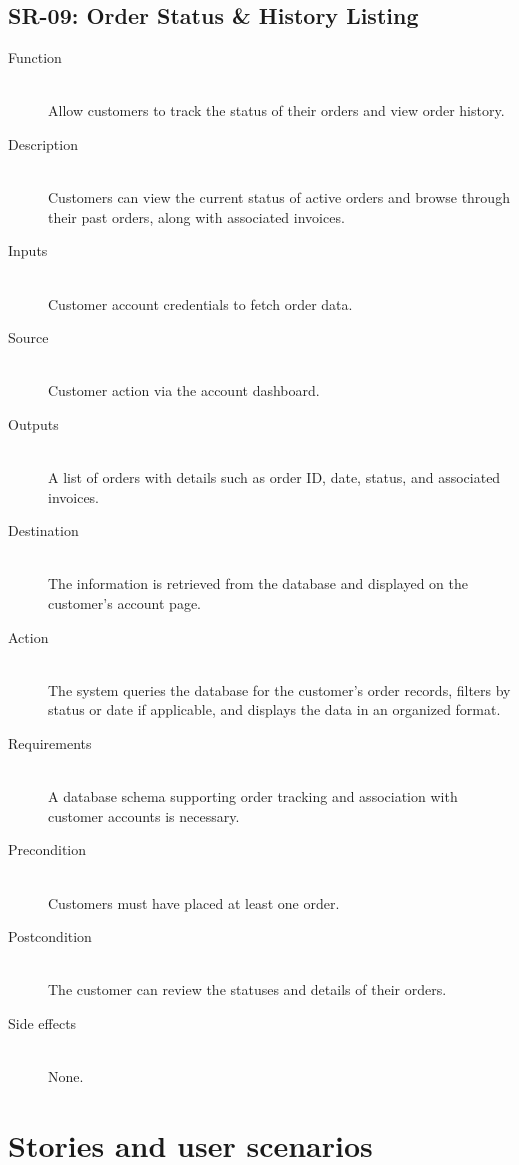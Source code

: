\documentclass[a4paper,journal]{IEEEtran}
\begin{document}
\subsection{SR-09: Order Status \& History Listing}
\begin{description}
  \item[Function] \hfill \\
  Allow customers to
  track the status of their orders and view order history.
  \item[Description] \hfill \\
  Customers can view the current status of active orders
  and browse through their past orders, along with associated invoices.
  \item[Inputs] \hfill \\
  Customer account credentials to fetch order data.
  \item[Source] \hfill \\
  Customer action via the account dashboard.
  \item[Outputs] \hfill \\
  A list of orders with details such as order ID, date,
  status, and associated invoices.
  \item[Destination] \hfill \\
  The information is retrieved from the database and
  displayed on the customer’s account page.
  \item[Action] \hfill \\
  The system queries the database for the customer’s
  order records, filters by status or date if applicable, and displays the data
  in an organized format.
  \item[Requirements] \hfill \\
  A database schema supporting order tracking and
  association with customer accounts is necessary.
  \item[Precondition] \hfill \\
  Customers must have placed at least one order.
  \item[Postcondition] \hfill \\
  The customer can review the statuses and details of
  their orders.
  \item[Side effects] \hfill \\
  None.
\end{description}

\section{Stories and user scenarios}
\end{document}
